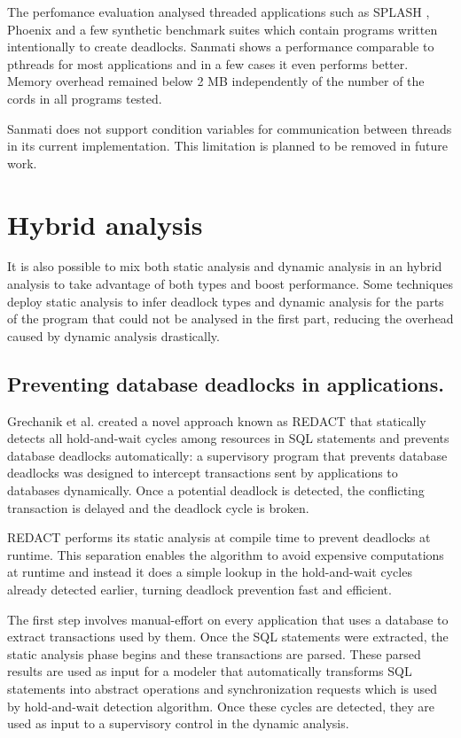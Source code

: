 The perfomance evaluation analysed threaded applications such as SPLASH \cite{splash}, Phoenix \cite{phoenix} and a few synthetic benchmark suites which contain programs written
intentionally to create deadlocks. Sanmati shows a performance comparable to pthreads for most applications and in a few cases it even performs better.
Memory overhead remained below 2 MB independently of the number of the cords in all programs tested.

Sanmati does not support condition variables for communication between threads in its current implementation. This limitation is planned to be removed in future work.

\section{Hybrid analysis}

It is also possible to mix both static analysis and dynamic analysis in an hybrid analysis to take advantage of both types and boost performance.
Some techniques deploy static analysis to infer deadlock types and dynamic analysis for the parts of the program that could not be analysed in the first part,
reducing the overhead caused by dynamic analysis drastically.

\subsection{Preventing database deadlocks in applications.} Grechanik et al. \cite{grechanik}
created a novel approach known as REDACT that statically detects all hold-and-wait cycles among resources in SQL statements and prevents database deadlocks automatically: a supervisory
program that prevents database deadlocks was designed to intercept transactions sent by applications to databases dynamically. Once a potential deadlock is detected, the
conflicting transaction is delayed and the deadlock cycle is broken.

REDACT performs its static analysis at compile time to prevent deadlocks at runtime. This separation enables the algorithm to avoid expensive computations at runtime
and instead it does a simple lookup in the hold-and-wait cycles already detected earlier, turning deadlock prevention fast and efficient.

The first step involves manual-effort on every application that uses a database to extract transactions used by them. Once the SQL statements were extracted, the static analysis
phase begins and these transactions are parsed. These parsed results are used as input for a modeler that automatically transforms SQL statements into abstract operations
and synchronization requests which is used by hold-and-wait detection algorithm. Once these cycles are detected, they are used as input to a supervisory control in the dynamic analysis.

